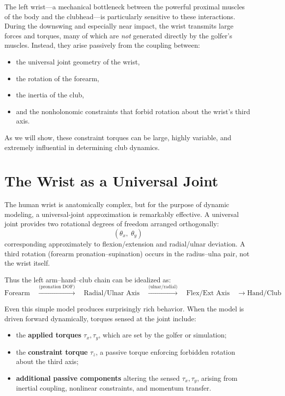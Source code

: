 \documentclass[11pt]{article}
\begin{document}
The left wrist---a mechanical bottleneck between the powerful proximal muscles of the body and the 
clubhead---is particularly sensitive to these interactions.  
During the downswing and especially near impact, the wrist transmits large forces and torques, many of 
which are \emph{not} generated directly by the golfer’s muscles.  
Instead, they arise passively from the coupling between:
\begin{itemize}
    \item the universal joint geometry of the wrist,
    \item the rotation of the forearm,
    \item the inertia of the club,
    \item and the nonholonomic constraints that forbid rotation about the wrist’s third axis.
\end{itemize}

As we will show, these constraint torques can be large, highly variable, and extremely influential 
in determining club dynamics.

\section{The Wrist as a Universal Joint}

The human wrist is anatomically complex, but for the purpose of dynamic modeling, a universal-joint 
approximation is remarkably effective.  
A universal joint provides two rotational degrees of freedom arranged orthogonally:
\[
(\theta_x,\; \theta_y)
\]
corresponding approximately to flexion/extension and radial/ulnar deviation.  
A third rotation (forearm pronation--supination) occurs in the radius–ulna pair, not the wrist itself.

Thus the left arm–hand–club chain can be idealized as:
\[
\text{Forearm} \quad 
\overset{\text{(pronation DOF)}}{\longrightarrow} \quad
\text{Radial/Ulnar Axis} \quad
\overset{\text{(ulnar/radial)}}{\longrightarrow} \quad
\text{Flex/Ext Axis} \quad
\longrightarrow \text{Hand/Club}
\]

Even this simple model produces surprisingly rich behavior.  
When the model is driven forward dynamically, torques sensed at the joint include:

\begin{itemize}
    \item the \textbf{applied torques} $\tau_x,\tau_y$, which are set by the golfer or simulation;
    \item the \textbf{constraint torque} $\tau_z$, a passive torque enforcing forbidden rotation about the third axis;
    \item \textbf{additional passive components} altering the sensed $\tau_x,\tau_y$, arising from inertial coupling, nonlinear constraints, and momentum transfer.
\end{itemize}
\end{document}
